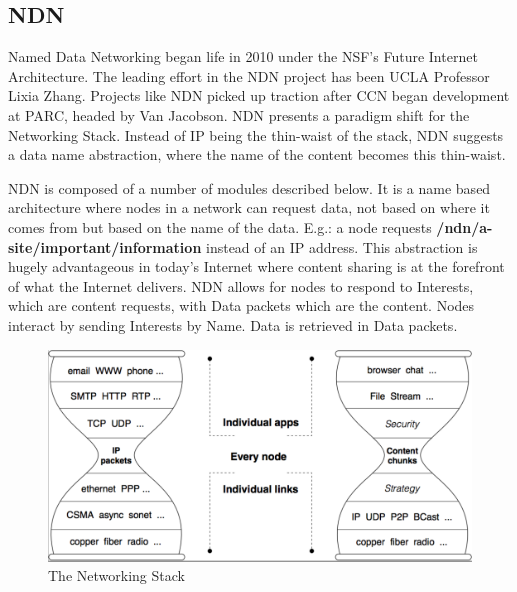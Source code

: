 \subsection{NDN}
Named Data Networking began life in 2010 under the NSF's Future Internet Architecture\cite{016}. The leading effort in the NDN project has been UCLA Professor Lixia Zhang. Projects like NDN picked up traction after CCN began development at PARC, headed by Van Jacobson. NDN presents a paradigm shift for the Networking Stack. Instead of IP being the thin-waist of the stack, NDN suggests a data name abstraction, where the name of the content becomes this thin-waist. \par
NDN is composed of a number of modules described below. It is a name based architecture where nodes in a network can request data, not based on where it comes from but based on the name of the data. E.g.: a node requests \textbf{/ndn/a-site/important/information} instead of an IP address. This abstraction is hugely advantageous in today's Internet where content sharing is at the forefront of what the Internet delivers. NDN allows for nodes to respond to Interests, which are content requests, with Data packets which are the content. Nodes interact by sending Interests by Name. Data is retrieved in Data packets.\par 
\begin{figure}[h]
\includegraphics[width=6in]{hourglass.png}
\caption{The Networking Stack\cite{017}}
\end{figure}
